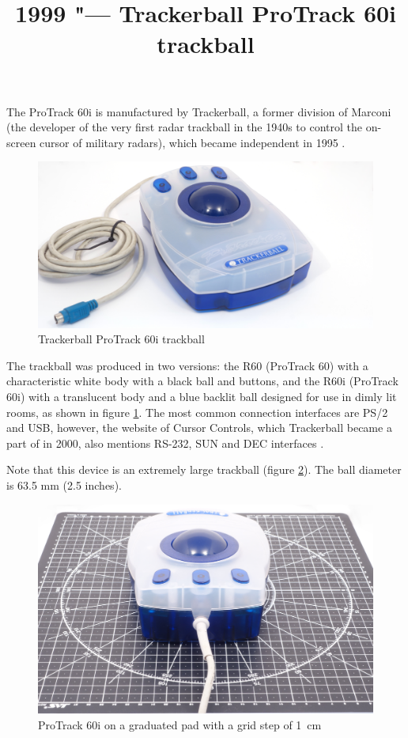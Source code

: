 \documentclass[11pt, a4paper]{article}
\begin{document}
\title{1999 "--- Trackerball ProTrack 60i trackball}
\date{}
\maketitle
{}
The ProTrack 60i is manufactured by Trackerball, a former division of Marconi (the developer of the very first radar trackball in the 1940s to control the on-screen cursor of military radars), which became independent in 1995 \cite{history}.

\begin{figure}[h]
    \centering
    \includegraphics[scale=0.35]{1999_protrack_60i/monstr1_30.jpg}
    \caption{Trackerball ProTrack 60i trackball}
    \label{fig:ProTrack60i}
\end{figure}

The trackball was produced in two versions: the R60 (ProTrack 60) with a characteristic white body with a black ball and buttons, and the R60i (ProTrack 60i) with a translucent body and a blue backlit ball designed for use in dimly lit rooms, as shown in figure \ref {fig:ProTrack60i}. The most common connection interfaces are PS/2 and USB, however, the website of Cursor Controls, which Trackerball became a part of in 2000, also mentions RS-232, SUN and DEC interfaces \cite{trackerball,cursorcontrols}.

Note that this device is an extremely large trackball (figure \ref{fig:ProTrack60iSize}). The ball diameter is 63.5 mm (2.5 inches).

\begin{figure}[h]
    \centering
    \includegraphics[scale=0.35]{1999_protrack_60i/monstr2.jpg}
    \caption{ProTrack 60i on a graduated pad with a grid step of 1~cm}
    \label{fig:ProTrack60iSize}
\end{figure}
\end{document}
